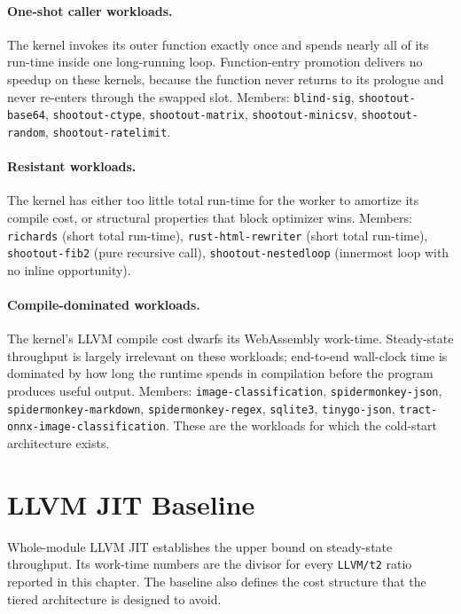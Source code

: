 \paragraph{One-shot caller workloads.} The kernel invokes its outer function exactly once and spends nearly all of its run-time inside one long-running loop. Function-entry promotion delivers no speedup on these kernels, because the function never returns to its prologue and never re-enters through the swapped slot. Members: \texttt{blind-sig}, \texttt{shootout-base64}, \texttt{shootout-ctype}, \texttt{shootout-matrix}, \texttt{shootout-minicsv}, \texttt{shootout-random}, \texttt{shootout-ratelimit}.

\paragraph{Resistant workloads.} The kernel has either too little total run-time for the worker to amortize its compile cost, or structural properties that block optimizer wins. Members: \texttt{richards} (short total run-time), \texttt{rust-html-rewriter} (short total run-time), \texttt{shootout-fib2} (pure recursive call), \texttt{shootout-nestedloop} (innermost loop with no inline opportunity).

\paragraph{Compile-dominated workloads.} The kernel's LLVM compile cost dwarfs its WebAssembly work-time. Steady-state throughput is largely irrelevant on these workloads; end-to-end wall-clock time is dominated by how long the runtime spends in compilation before the program produces useful output. Members: \texttt{image-classification}, \texttt{spidermonkey-json}, \texttt{spidermonkey-markdown}, \texttt{spidermonkey-regex}, \texttt{sqlite3}, \texttt{tinygo-json}, \texttt{tract-onnx-image-classification}. These are the workloads for which the cold-start architecture exists.

\section{LLVM JIT Baseline}
\label{sec:eval:llvm}

Whole-module LLVM JIT establishes the upper bound on steady-state throughput. Its work-time numbers are the divisor for every \texttt{LLVM/t2} ratio reported in this chapter. The baseline also defines the cost structure that the tiered architecture is designed to avoid.


